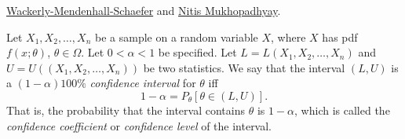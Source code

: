 \documentclass[../Notes.tex]{subfiles}
\begin{document}
\href{https://www.amazon.sg/Mathematical-Statistics-Applications-William-Mendenhall/dp/0495110817#customerReviews}{Wackerly-Mendenhall-Schaefer}
and \href{https://www.amazon.com/Probability-Statistical-Inference-Statistics-Monographs/dp/0824703790}{Nitis Mukhopadhyay}.
\begin{definition}{}{}
  Let \(X_1,X_2,\dots,X_n\) be a sample on a random variable \(X\), where \(X\) has pdf \(f(x;\theta)\), \(\theta \in \Omega\). Let \(0<\alpha<1\) be specified. Let \(L=L(X_1,X_2,\dots,X_n)\) and \(U=U((X_1,X_2,\dots,X_n))\) be two statistics. We say that the interval \((L,U)\) is a \((1-\alpha)100\%\) \emph{confidence interval} for \(\theta\) iff 
  \[1-\alpha=P_\theta[\theta \in (L,U)].\]
  That is, the probability that the interval contains \(\theta\) is \(1-\alpha\), which is called the \emph{confidence coefficient} or \emph{confidence level} of the interval.
\end{definition}
\end{document}
